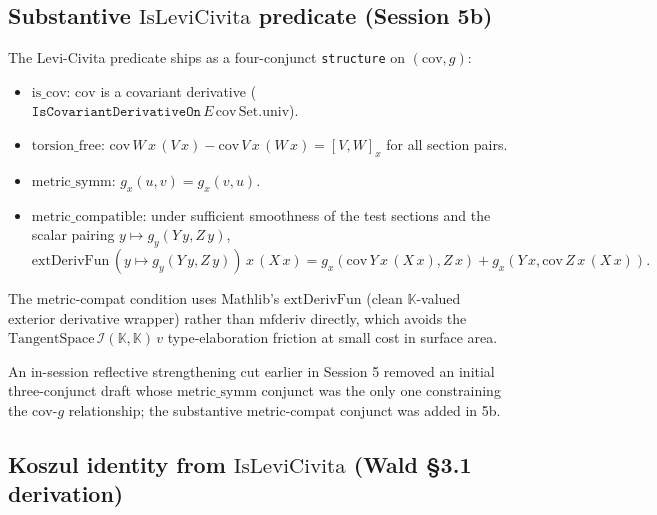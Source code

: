 \documentclass[twocolumn]{revtex4-2}
\begin{document}
\subsection{Substantive $\mathrm{IsLeviCivita}$ predicate (Session 5b)}

The Levi-Civita predicate ships as a four-conjunct \texttt{structure}
on $(\mathrm{cov}, g)$:
\begin{itemize}
\item $\mathrm{is\_cov}$: $\mathrm{cov}$ is a covariant derivative
  ($\texttt{IsCovariantDerivativeOn}\,E\,\mathrm{cov}\,\mathrm{Set.univ}$).
\item $\mathrm{torsion\_free}$:
  $\mathrm{cov}\,W\,x\,(V\,x) - \mathrm{cov}\,V\,x\,(W\,x) = [V, W]_x$
  for all section pairs.
\item $\mathrm{metric\_symm}$: $g_x(u, v) = g_x(v, u)$.
\item $\mathrm{metric\_compatible}$: under sufficient smoothness of
  the test sections and the scalar pairing
  $y \mapsto g_y(Y\,y, Z\,y)$,
  \[\mathrm{extDerivFun}\,(y \mapsto g_y(Y\,y, Z\,y))\,x\,(X\,x)
  = g_x(\mathrm{cov}\,Y\,x\,(X\,x), Z\,x) + g_x(Y\,x, \mathrm{cov}\,Z\,x\,(X\,x)).\]
\end{itemize}
The metric-compat condition uses Mathlib's $\mathrm{extDerivFun}$
(clean $\mathbb{K}$-valued exterior derivative wrapper) rather than
$\mathrm{mfderiv}$ directly, which avoids the
$\mathrm{TangentSpace}\,\mathcal{I}(\mathbb{K},\mathbb{K})\,v$
type-elaboration friction at small cost in surface area.

An in-session reflective strengthening cut earlier in Session 5
removed an initial three-conjunct draft whose $\mathrm{metric\_symm}$
conjunct was the only one constraining the $\mathrm{cov}$-$g$
relationship; the substantive metric-compat conjunct was added in 5b.

\subsection{Koszul identity from $\mathrm{IsLeviCivita}$ (Wald \S 3.1
derivation)}
\end{document}

